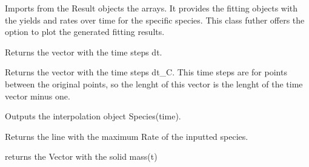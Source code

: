 \documentclass[letterpaper,10pt,english]{sphinxmanual}
\begin{document}
\begin{fulllineitems}
\label{FittingClasses:Fit_one_run.Fit_one_run}
Imports from the Result objects the arrays. It provides the fitting objects with the yields and rates over time for the specific species. This class futher offers the option to plot the generated fitting results.

\begin{fulllineitems}
\label{FittingClasses:Fit_one_run.Fit_one_run.Dt}
Returns the vector with the time steps dt.

\end{fulllineitems}


\begin{fulllineitems}
\label{FittingClasses:Fit_one_run.Fit_one_run.DtC}
Returns the vector with the time steps dt\_C. This time steps are for points between the original points, so the lenght of this vector is the lenght of the time vector minus one.

\end{fulllineitems}


\begin{fulllineitems}
\label{FittingClasses:Fit_one_run.Fit_one_run.Interpolate}
Outputs the interpolation object Species(time).

\end{fulllineitems}


\begin{fulllineitems}
\label{FittingClasses:Fit_one_run.Fit_one_run.LineNumberMaxRate}
Returns the line with the maximum Rate of the inputted species.

\end{fulllineitems}


\begin{fulllineitems}
\label{FittingClasses:Fit_one_run.Fit_one_run.MassCoal}
returns the Vector with the solid mass(t)


\end{fulllineitems}
\end{fulllineitems}
\end{document}
